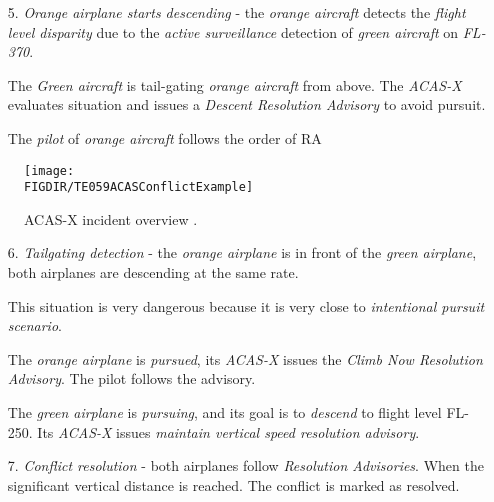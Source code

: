 \begin{itemize}
    \item[5.] \emph{Orange airplane starts descending} -  the \emph{orange aircraft} detects the \emph{flight level disparity} due to the \emph{active surveillance} detection of \emph{green aircraft} on \emph{FL-370}.
    
    The \emph{Green aircraft} is tail-gating \emph{orange aircraft} from above. The \emph{ACAS-X} evaluates situation and issues a \emph{Descent Resolution Advisory} to avoid pursuit. 
    
    The \emph{pilot} of \emph{orange aircraft} follows the order of RA
\end{itemize}


\begin{figure}[H]
    \centering
    \texttt{[image: \\FIGDIR/TE059ACASConflictExample]}
    \caption{ACAS-X incident overview \cite{netalert2013n17}.}
    \label{fig:axasxincidentoverviewexample}
\end{figure}

\begin{itemize}
    \item[6.] \emph{Tailgating detection} - the \emph{orange airplane} is in front of the \emph{green airplane}, both airplanes are descending at the same rate. 
    
    \begin{note}
        This situation is very dangerous because it is very close to \emph{intentional pursuit scenario}.
    \end{note}
    
    The \emph{orange airplane} is \emph{pursued}, its \emph{ACAS-X} issues the \emph{Climb Now Resolution Advisory}. The pilot follows the advisory.
    
    The \emph{green airplane} is \emph{pursuing}, and its goal is to \emph{descend} to flight level FL-250. Its \emph{ACAS-X} issues \emph{maintain vertical speed resolution advisory}.
    
    \item[7.] \emph{Conflict resolution} - both airplanes follow \emph{Resolution Advisories}.  When the significant vertical distance is reached. The conflict is marked as resolved. 
\end{itemize}

